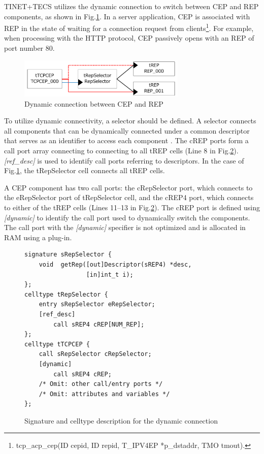 \documentclass[JIP]{ipsj_v2/UTF8/ipsj}
\begin{document}
TINET+TECS utilizes the dynamic connection to switch between CEP and REP components, as shown in Fig.\ref{fig:DynamicConnectionUseCase}.
In a server application, CEP is associated with REP in the state of waiting for a connection request from clients\footnote{tcp\_acp\_cep(ID cepid, ID repid, T\_IPV4EP *p\_dstaddr, TMO tmout).}.
For example, when processing with the HTTP protocol, CEP passively opens with an REP of port number 80.

\begin{figure}[t]
    \centering
    \includegraphics[width=8.0cm,clip]{figure/DynamicConnectionUseCase.pdf}
    \caption{Dynamic connection between CEP and REP}
    \label{fig:DynamicConnectionUseCase}
\end{figure}

To utilize dynamic connectivity, a selector should be defined.
A selector connects all components that can be dynamically connected under a common descriptor that serves as an identifier to access each component \cite{par:optimization}.
The cREP ports form a call port array connecting to connecting to all tREP cells (Line 8 in Fig.\ref{src:DynamicCDLcode}).
{\it [ref\_desc]} is used to identify call ports referring to descriptors. 
In the case of Fig.\ref{fig:DynamicConnectionUseCase}, the tRepSelector cell connects all tREP cells.

A CEP component has two call ports: the cRepSelector port, which connects to the eRepSelector port of tRepSelector cell, and the cREP4 port, which connects to either of the tREP cells (Lines 11--13 in Fig.\ref{src:DynamicCDLcode}).
The cREP port is defined using {\it [dynamic]} to identify the call port used to dynamically switch the components.
The call port with the {\it [dynamic]} specifier is not optimized and is allocated in RAM using a plug-in.

\begin{figure}[t]
\centering
\begin{lstlisting}
signature sRepSelector {
    void  getRep([out]Descriptor(sREP4) *desc,
                 [in]int_t i);
};
celltype tRepSelector {
    entry sRepSelector eRepSelector;
    [ref_desc]
        call sREP4 cREP[NUM_REP];
};
celltype tTCPCEP {
    call sRepSelector cRepSelector;
    [dynamic]
        call sREP4 cREP;
    /* Omit: other call/entry ports */
    /* Omit: attributes and variables */
};
\end{lstlisting}
\caption{Signature and celltype description for the dynamic connection}
\label{src:DynamicCDLcode}
\end{figure}
\end{document}
